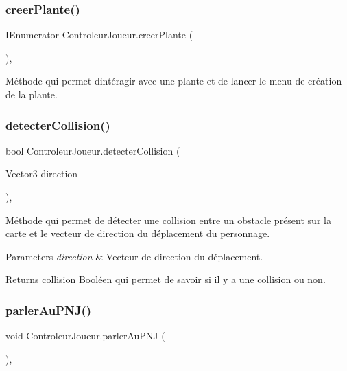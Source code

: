 \subsubsection{\texorpdfstring{creer\+Plante()}{creerPlante()}}
{\footnotesize\ttfamily I\+Enumerator Controleur\+Joueur.\+creer\+Plante (\begin{DoxyParamCaption}{ }\end{DoxyParamCaption})\hspace{0.3cm}{\ttfamily [inline]}, {\ttfamily [private]}}

Méthode qui permet d\textquotesingle{}intéragir avec une plante et de lancer le menu de création de la plante. \mbox{\label{class_controleur_joueur_a2943f91d2df443fc1a3208dbe57f9f9c}} 
\subsubsection{\texorpdfstring{detecter\+Collision()}{detecterCollision()}}
{\footnotesize\ttfamily bool Controleur\+Joueur.\+detecter\+Collision (\begin{DoxyParamCaption}\item[{Vector3}]{direction }\end{DoxyParamCaption})\hspace{0.3cm}{\ttfamily [inline]}, {\ttfamily [private]}}

Méthode qui permet de détecter une collision entre un obstacle présent sur la carte et le vecteur de direction du déplacement du personnage. 
\begin{DoxyParams}{Parameters}
{\em direction} & Vecteur de direction du déplacement. \\
\hline
\end{DoxyParams}
\begin{DoxyReturn}{Returns}
collision Booléen qui permet de savoir si il y a une collision ou non. 
\end{DoxyReturn}
\mbox{\label{class_controleur_joueur_ab65cb2d9d498fb5f21f542c03878189f}} 
\subsubsection{\texorpdfstring{parler\+Au\+P\+N\+J()}{parlerAuPNJ()}}
{\footnotesize\ttfamily void Controleur\+Joueur.\+parler\+Au\+P\+NJ (\begin{DoxyParamCaption}{ }\end{DoxyParamCaption})\hspace{0.3cm}{\ttfamily [inline]}, {\ttfamily [private]}}

